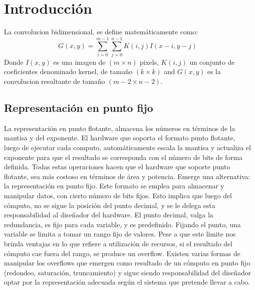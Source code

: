 \chapter{Introducción}\label{intro_secc}

La convolucion bidimensional, se define matemáticamente como:
\begin{equation}\label{conv-org}
  G(x,y) = \sum_{i=0}^{m-1} \sum_{j=0}^{n-1}K(i,j)I(x-i,y-j)
\end{equation}
Donde $I(x,y)$ es una imagen de $(m \times n)$ pixels, $K(i,j)$ un conjunto de
coeficientes denominado kernel, de tamaño $(k \times k)$ and $G(x,y)$ es la
convolucion resultante de tamaño  $(m-2 \times n-2)$.

\section{Representación en punto fijo}\label{fixedpoint}

La representación en punto flotante, almacena los números en términos de la mantisa y del exponente. El hardware que soporta el formato punto flotante, luego de ejecutar cada computo, 
automáticamente escala la mantisa y actualiza el exponente para que el resultado se corresponda con el número de bits de forma definida. Todas estas operaciones hacen que el hardware que soporte punto flotante,
sea más costoso en términos de área y potencia. Emerge una alternativa: la representación en punto fijo.
Este formato se emplea para almacenar y manipular datos, con cierto número de bits fijos. Esto implica que luego del cómputo, no se sigue la posición del punto decimal, y
se le delega esta responsabilidad al diseñador del hardware. El punto decimal, valga la redundancia, es fijo para cada variable, y es predefinido.
Fijando el punto, una variable se limita a tomar un rango fijo de valores.
Pese a que este límite nos brinda ventajas en lo que refiere a utilización de recursos, si el resultado del cómputo cae fuera del rango, se produce un overflow. Existen varias
formas de manipular los overflows que emergen como resultado de un cómputo en punto fijo (redondeo, saturación, truncamiento) y sigue siendo responsabilidad del diseñador optar por
la representación adecuada según el sistema que pretende llevar a cabo.

